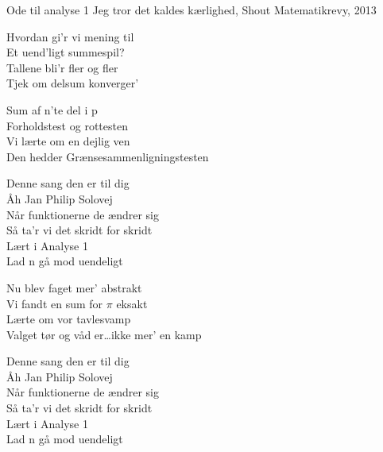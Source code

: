 \begin{song}{Ode til analyse 1}
  {} %
  {Jeg tror det kaldes kærlighed, Shout} %
  {} %
  {Matematikrevy, 2013} %
  {\NotCCLIed} %

  \begin{SBVerse}
    Hvordan gi’r vi mening til\\
    Et uend’ligt summespil?\\
    Tallene bli’r fler og fler\\
    Tjek om delsum konverger’
  \end{SBVerse}

  \begin{SBVerse}
    Sum af n’te del i p\\
    Forholdstest og rottesten\\
    Vi lærte om en dejlig ven\\
    Den hedder Grænsesammenligningstesten
  \end{SBVerse}

  \begin{SBChorus}
    Denne sang den er til dig\\
    Åh Jan Philip Solovej\\
    Når funktionerne de ændrer sig\\
    \medskip
    Så ta’r vi det skridt for skridt\\
    Lært i Analyse 1\\
    Lad n gå mod uendeligt
  \end{SBChorus}

  \begin{SBVerse}
    Nu blev faget mer’ abstrakt\\
    Vi fandt en sum for $\pi$ eksakt\\
    Lærte om vor tavlesvamp\\
    Valget tør og våd er\ldots ikke mer’ en kamp
  \end{SBVerse}

  \begin{SBChorus}
    Denne sang den er til dig\\
    Åh Jan Philip Solovej\\
    Når funktionerne de ændrer sig\\
    \medskip
    Så ta’r vi det skridt for skridt\\
    Lært i Analyse 1\\
    Lad n gå mod uendeligt
  \end{SBChorus}


\end{song}
